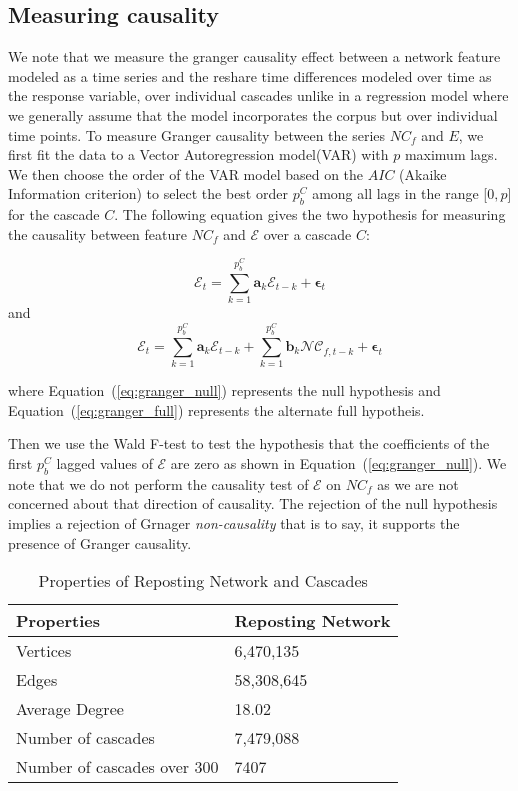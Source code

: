 \documentclass[smallextended]{svjour3}       %
\theoremstyle{definition}
\begin{document}
\subsection{Measuring causality}
We note that we measure the granger causality effect between a network feature modeled as a time series and the reshare time differences modeled over time as the response variable, over individual cascades unlike in a regression model where we generally assume that the model incorporates the corpus but over individual time points. To measure Granger causality between the series $NC_f$ and $E$, we first 
fit the data to a Vector Autoregression model(VAR) with $p$ maximum lags. We then choose the order of the VAR model based on the $AIC$ (Akaike Information criterion) to select the best order $p_b^C$ among all lags in the range [$0, p$] for the cascade $C$. The following equation gives the two hypothesis for measuring the causality between feature $NC_f$ and $\mathcal{E}$ over a cascade $C$:

\begin{equation}
\mathbf{\mathcal{E}}_t = \sum_{k=1}^{p_b^C} \mathbf{a}_{k} \mathbf{\mathcal{E}}_{t-k} + \mathbf{\epsilon}_{t}
\label{eq:granger_null}
\end{equation}
and 
\begin{equation}
\mathbf{\mathcal{E}}_t = \sum_{k=1}^{p_b^C} \mathbf{a}_{k} \mathbf{\mathcal{E}}_{t-k} + \sum_{k=1}^{p_b^C} \mathbf{b}_{k} \mathbf{\mathcal{NC}}_{f, t-k} + \mathbf{\epsilon}_{t}
\label{eq:granger_full}
\end{equation}

where Equation~(\ref{eq:granger_null}) represents the null hypothesis and Equation~(\ref{eq:granger_full}) represents the alternate full hypotheis.

 Then we use the Wald F-test to  test the hypothesis that the coefficients of the first $p_b^C$ lagged values of $\mathcal{E}$ are zero as shown in Equation~(\ref{eq:granger_null}). We note that we do not perform the causality test of $\mathcal{E}$ on $NC_f$ as we are not concerned about that direction of causality. The rejection of the null hypothesis implies a rejection of Grnager \textit{non-causality} that is to say, it supports the presence of Granger causality.
  

\begin{table}[!t]
	\centering
	\renewcommand{\arraystretch}{1}
	\caption{Properties of Reposting Network and Cascades}
	\begin{tabular}{|p{5cm}|p{4cm}|}
		\hline 
		{\bf Properties} & {\bf Reposting Network}\\ 
		\hline\hline
		Vertices           & 6,470,135 \\
		\hline
		Edges & 58,308,645 \\
		\hline 
		Average Degree & 18.02    \\       
		\hline \hline 
		Number of cascades & 7,479,088 \\
		\hline
		Number of cascades over 300 & 7407\\
		\hline
	\end{tabular}
	\label{tab:table2}
\end{table}
\end{document}
